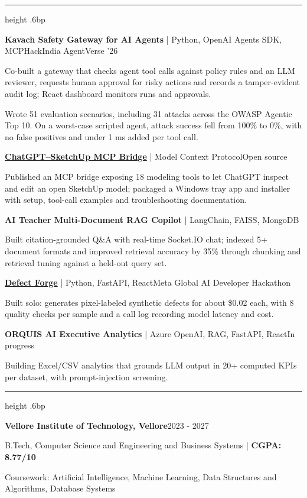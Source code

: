 \documentclass[10pt]{article}
\newcommand{\resumesection}[1]{\par\vspace{5.5bp}{\fontsize{10.56bp}{12.5bp}\selectfont\bfseries #1\par}\vspace{1bp}\hrule height .6bp\vspace{3bp}}
\newcommand{\entry}[2]{\par #1\hfill #2\par}
\newcommand{\nextentry}[2]{\par\vspace{2bp}\entry{#1}{#2}}
\newcommand{\bulletitem}[1]{\par\begingroup\hangindent=11.52bp\hangafter=1\noindent\makebox[11.52bp][l]{\textbullet}#1\par\endgroup}
\begin{document}
\resumesection{SELECTED AI PROJECTS}
\entry{\textbf{Kavach Safety Gateway for AI Agents} | Python, OpenAI Agents SDK, MCP}{HackIndia AgentVerse '26}
\bulletitem{Co-built a gateway that checks agent tool calls against policy rules and an LLM reviewer, requests human approval for risky actions and records a tamper-evident audit log; React dashboard monitors runs and approvals.}
\bulletitem{Wrote 51 evaluation scenarios, including 31 attacks across the OWASP Agentic Top 10. On a worst-case scripted agent, attack success fell from 100\% to 0\%, with no false positives and under 1 ms added per tool call.}
\nextentry{\href{https://github.com/Hydra-Of-Malice/SketchUp-2022-ChatGPT-MCP}{\textbf{ChatGPT--SketchUp MCP Bridge}} | Model Context Protocol}{Open source}
\bulletitem{Published an MCP bridge exposing 18 modeling tools to let ChatGPT inspect and edit an open SketchUp model; packaged a Windows tray app and installer with setup, tool-call examples and troubleshooting documentation.}
\nextentry{\textbf{AI Teacher Multi-Document RAG Copilot} | LangChain, FAISS, MongoDB}{}
\bulletitem{Built citation-grounded Q\&A with real-time Socket.IO chat; indexed 5+ document formats and improved retrieval accuracy by 35\% through chunking and retrieval tuning against a held-out query set.}
\nextentry{\href{https://github.com/Hydra-Of-Malice/defect_forge}{\textbf{Defect Forge}} | Python, FastAPI, React}{Meta Global AI Developer Hackathon}
\bulletitem{Built solo: generates pixel-labeled synthetic defects for about \$0.02 each, with 8 quality checks per sample and a call log recording model latency and cost.}
\nextentry{\textbf{ORQUIS AI Executive Analytics} | Azure OpenAI, RAG, FastAPI, React}{In progress}
\bulletitem{Building Excel/CSV analytics that grounds LLM output in 20+ computed KPIs per dataset, with prompt-injection screening.}

\resumesection{EDUCATION}
\entry{\textbf{Vellore Institute of Technology, Vellore}}{2023 - 2027}
B.Tech, Computer Science and Engineering and Business Systems | \textbf{CGPA: 8.77/10}\par
Coursework: Artificial Intelligence, Machine Learning, Data Structures and Algorithms, Database Systems
\end{document}
